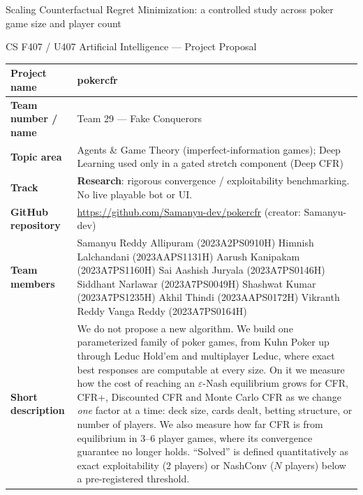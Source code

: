 \documentclass[10pt,a4paper]{article}
\newcommand{\eps}{\varepsilon}
\begin{document}
\thispagestyle{empty}
{\LARGE\bfseries\raggedright Scaling Counterfactual Regret Minimization: a controlled study across poker game size and player count\par}
\vspace{4pt}
{\large CS F407 / U407 Artificial Intelligence --- Project Proposal\par}
\vspace{12pt}

\begin{tabularx}{\textwidth}{|>{\columncolor{gray!10}\bfseries}p{}|X|}
\hline
Project name & pokercfr \\ \hline
Team number / name & Team 29 --- Fake Conquerors \\ \hline
Topic area & Agents \& Game Theory (imperfect-information games); Deep Learning used only in a gated stretch component (Deep CFR) \\ \hline
Track & \textbf{Research}: rigorous convergence / exploitability benchmarking. No live playable bot or UI. \\ \hline
GitHub repository & \url{https://github.com/Samanyu-dev/pokercfr} (creator: Samanyu-dev) \\ \hline
Team members &
Samanyu Reddy Allipuram (2023A2PS0910H) \newline
Himnish Lalchandani (2023AAPS1131H) \newline
Aarush Kanipakam (2023A7PS1160H) \newline
Sai Aashish Juryala (2023A7PS0146H) \newline
Siddhant Narlawar (2023A7PS0049H) \newline
Shashwat Kumar (2023A7PS1235H) \newline
Akhil Thindi (2023AAPS0172H) \newline
Vikranth Reddy Vanga Reddy (2023A7PS0164H) \\ \hline
Short description &
We do not propose a new algorithm. We build one parameterized family of poker games, from Kuhn Poker up through Leduc Hold'em and multiplayer Leduc, where exact best responses are computable at every size. On it we measure how the cost of reaching an $\eps$-Nash equilibrium grows for CFR, CFR+, Discounted CFR and Monte Carlo CFR as we change \emph{one} factor at a time: deck size, cards dealt, betting structure, or number of players. We also measure how far CFR is from equilibrium in 3--6 player games, where its convergence guarantee no longer holds. ``Solved'' is defined quantitatively as exact exploitability (2 players) or NashConv ($N$ players) below a pre-registered threshold. \\ \hline
\end{tabularx}
\end{document}
